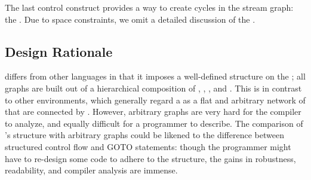 The last control construct provides a way to create cycles in the
stream graph: the \feedbackloop.  Due to space constraints, we
omit a detailed discussion of the \feedbackloop.

\subsection{Design Rationale}

\StreamIt differs from other \stream languages in that it imposes
a well-defined structure on the \streams; all \stream graphs are
built out of a hierarchical composition of \filters, \pipelines,
\splitjoins, and \feedbackloops.  This is in contrast to other
environments, which generally regard a \stream as a flat and
arbitrary network of \filters that are connected by \Channels.
However, arbitrary graphs are very hard for the compiler to
analyze, and equally difficult for a programmer to describe.  The
comparison of \StreamIt's structure with arbitrary \stream graphs
could be likened to the difference between structured control flow
and GOTO statements: though the programmer might have to re-design
some code to adhere to the structure, the gains in robustness,
readability, and compiler analysis are immense.


